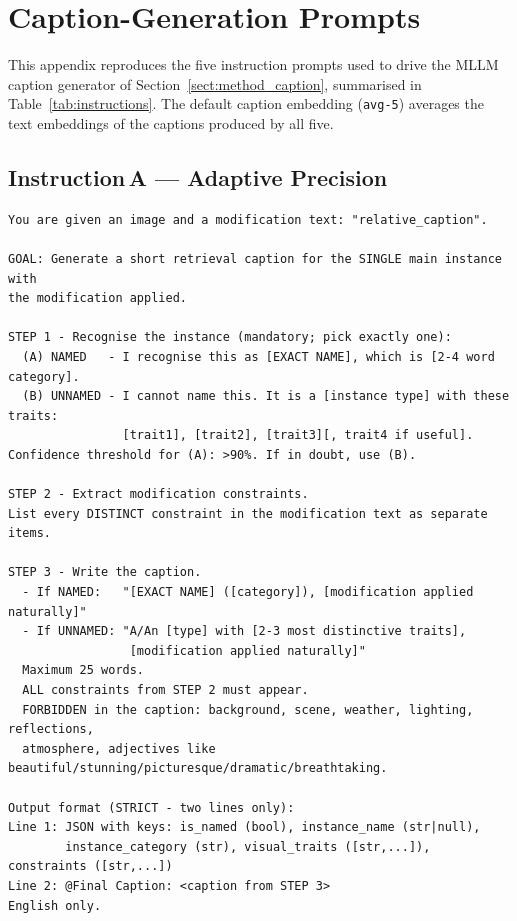 

\chapter{Caption-Generation Prompts}\label{app:prompts}

This appendix reproduces the five instruction prompts used to drive the MLLM
caption generator of Section~\ref{sect:method_caption}, summarised in
Table~\ref{tab:instructions}. The default caption embedding (\texttt{avg-5})
averages the text embeddings of the captions produced by all five.

\section*{Instruction\,A --- Adaptive Precision}
\begin{verbatim}
You are given an image and a modification text: "relative_caption".

GOAL: Generate a short retrieval caption for the SINGLE main instance with
the modification applied.

STEP 1 - Recognise the instance (mandatory; pick exactly one):
  (A) NAMED   - I recognise this as [EXACT NAME], which is [2-4 word category].
  (B) UNNAMED - I cannot name this. It is a [instance type] with these traits:
                [trait1], [trait2], [trait3][, trait4 if useful].
Confidence threshold for (A): >90%. If in doubt, use (B).

STEP 2 - Extract modification constraints.
List every DISTINCT constraint in the modification text as separate items.

STEP 3 - Write the caption.
  - If NAMED:   "[EXACT NAME] ([category]), [modification applied naturally]"
  - If UNNAMED: "A/An [type] with [2-3 most distinctive traits],
                 [modification applied naturally]"
  Maximum 25 words.
  ALL constraints from STEP 2 must appear.
  FORBIDDEN in the caption: background, scene, weather, lighting, reflections,
  atmosphere, adjectives like beautiful/stunning/picturesque/dramatic/breathtaking.

Output format (STRICT - two lines only):
Line 1: JSON with keys: is_named (bool), instance_name (str|null),
        instance_category (str), visual_traits ([str,...]), constraints ([str,...])
Line 2: @Final Caption: <caption from STEP 3>
English only.
\end{verbatim}


